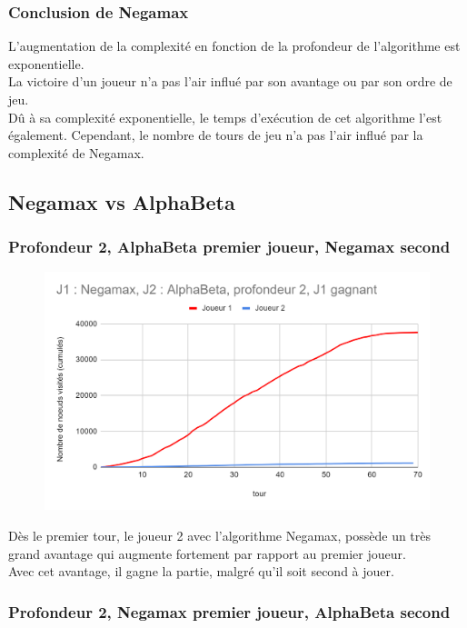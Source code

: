 \documentclass[12pt]{article}
\begin{document}
\subsubsection{Conclusion de Negamax}

L’augmentation de la complexité en fonction de la profondeur de l’algorithme est exponentielle.\\
La victoire d’un joueur n’a pas l’air influé par son avantage ou par son ordre de jeu.\\
Dû à sa complexité exponentielle, le temps d’exécution de cet algorithme l’est également.
Cependant, le nombre de tours de jeu n'a pas l'air influé par la complexité de Negamax.

\newpage
\subsection{Negamax vs AlphaBeta}

\subsubsection{Profondeur 2, AlphaBeta premier joueur, Negamax second}

\begin{figure}[!h]
   \includegraphics[width=\textwidth]{prof2alphaVSnegamax.png}
\end{figure}

Dès le premier tour, le joueur 2 avec l'algorithme Negamax, possède un très grand avantage qui augmente fortement par rapport au premier joueur.\\
Avec cet avantage, il gagne la partie, malgré qu'il soit second à jouer.

\newpage
\subsubsection{Profondeur 2, Negamax premier joueur, AlphaBeta second}
\end{document}
